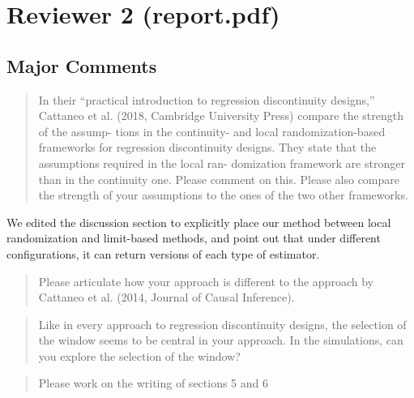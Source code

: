 \documentclass[12pt]{article}
\begin{document}
\section{Reviewer 2 (report.pdf)}

\subsection{Major Comments}
\begin{quote}
In their “practical introduction to regression discontinuity designs,”
Cattaneo et al. (2018, Cambridge University Press) compare the
strength of the assump- tions in the continuity- and local
randomization-based frameworks for regression discontinuity
designs. They state that the assumptions required in the local ran-
domization framework are stronger than in the continuity one. Please
comment on this. Please also compare the strength of your assumptions
to the ones of the two other frameworks.
\end{quote}

We edited the discussion section to explicitly place our method
between local randomization and limit-based methods, and point out
that under different configurations, it can return versions of each
type of estimator.

\begin{quote}
Please articulate how your approach is different to the approach by
Cattaneo et al. (2014, Journal of Causal Inference).
\end{quote}

\begin{quote}
Like in every approach to regression discontinuity designs, the
selection of the window seems to be central in your approach. In the
simulations, can you explore the selection of the window?
\end{quote}

\begin{quote}
Please work on the writing of sections 5 and 6
\end{quote}
\end{document}
